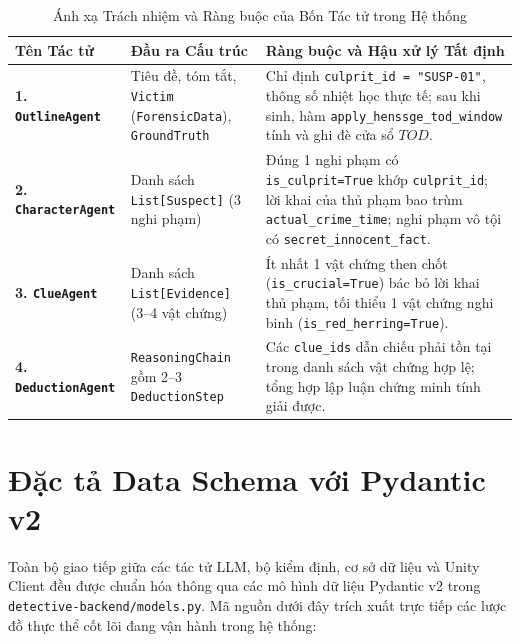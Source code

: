 \begin{table}[H]
\centering
\caption{Ánh xạ Trách nhiệm và Ràng buộc của Bốn Tác tử trong Hệ thống}
\label{tab:multi_agent_mapping}
\begin{tabularx}{\textwidth}{p{3.6cm} p{5.4cm} X}
\toprule
\textbf{Tên Tác tử} & \textbf{Đầu ra Cấu trúc} & \textbf{Ràng buộc và Hậu xử lý Tất định} \\
\midrule
\textbf{1. \texttt{OutlineAgent}} & Tiêu đề, tóm tắt, \texttt{Victim} (\texttt{ForensicData}), \texttt{GroundTruth} & Chỉ định \texttt{culprit\_id = "SUSP-01"}, thông số nhiệt học thực tế; sau khi sinh, hàm \texttt{apply\_henssge\_tod\_window} tính và ghi đè cửa sổ $TOD$. \\
\textbf{2. \texttt{CharacterAgent}} & Danh sách \texttt{List[Suspect]} (3 nghi phạm) & Đúng 1 nghi phạm có \texttt{is\_culprit=True} khớp \texttt{culprit\_id}; lời khai của thủ phạm bao trùm \texttt{actual\_crime\_time}; nghi phạm vô tội có \texttt{secret\_innocent\_fact}. \\
\textbf{3. \texttt{ClueAgent}} & Danh sách \texttt{List[Evidence]} (3--4 vật chứng) & Ít nhất 1 vật chứng then chốt (\texttt{is\_crucial=True}) bác bỏ lời khai thủ phạm, tối thiểu 1 vật chứng nghi binh (\texttt{is\_red\_herring=True}). \\
\textbf{4. \texttt{DeductionAgent}} & \texttt{ReasoningChain} gồm 2--3 \texttt{DeductionStep} & Các \texttt{clue\_ids} dẫn chiếu phải tồn tại trong danh sách vật chứng hợp lệ; tổng hợp lập luận chứng minh tính giải được. \\
\bottomrule
\end{tabularx}
\end{table}

\section{Đặc tả Data Schema với Pydantic v2}
\label{sec:arch_contracts}

Toàn bộ giao tiếp giữa các tác tử LLM, bộ kiểm định, cơ sở dữ liệu và Unity Client đều được chuẩn hóa thông qua các mô hình dữ liệu Pydantic v2 trong \texttt{detective-backend/models.py}. Mã nguồn dưới đây trích xuất trực tiếp các lược đồ thực thể cốt lõi đang vận hành trong hệ thống:

